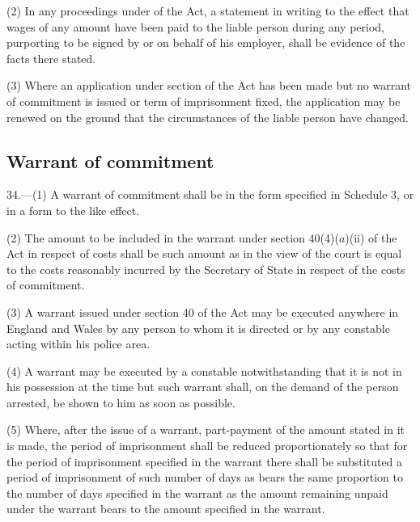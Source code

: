 \documentclass[12pt,a4paper]{article}
\begin{document}
(2) In any proceedings under 
of the Act, a statement in writing to the effect that wages of any amount have been paid to the liable person during any period, purporting to be signed by or on behalf of his employer, shall be evidence of the facts there stated.

(3) Where an application under section 
of the Act has been made but no warrant of commitment is issued or term of imprisonment fixed, the application may be renewed on the ground that the circumstances of the liable person have changed.


\subsection[34. Warrant of commitment]{Warrant of commitment}

34.—(1) A warrant of commitment shall be in the form specified in Schedule 3, or in a form to the like effect.

(2) The amount to be included in the warrant under section 40(4)($a$)(ii) of the Act in respect of costs shall be such amount as in the view of the court is equal to the costs reasonably incurred by the Secretary of State in respect of the costs of commitment.

(3) A warrant issued under section 40 of the Act may be executed anywhere in England and Wales by any person to whom it is directed or by any constable acting within his police area.

(4) A warrant may be executed by a constable notwithstanding that it is not in his possession at the time but such warrant shall, on the demand of the person arrested, be shown to him as soon as possible.

(5) Where, after the issue of a warrant, part-payment of the amount stated in it is made, the period of imprisonment shall be reduced proportionately so that for the period of imprisonment specified in the warrant there shall be substituted a period of imprisonment of such number of days as bears the same proportion to the number of days specified in the warrant as the amount remaining unpaid under the warrant bears to the amount specified in the warrant.
\end{document}
